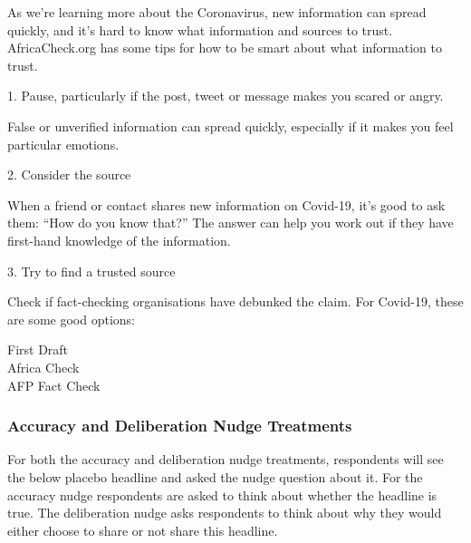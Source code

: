 \documentclass[letterpaper, 12pt, parskip=full,]{scrartcl}
\begin{document}
As we're learning more about the Coronavirus, new information can spread quickly, and it's hard to know what information and sources to trust. AfricaCheck.org has some tips for how to be smart about what information to trust. 

1. Pause, particularly if the post, tweet or message makes you scared or angry. 

False or unverified information can spread quickly, especially if it makes you feel particular emotions.

2. Consider the source

When a friend or contact shares new information on Covid-19, it’s good to ask them: “How do you know that?” The answer can help you work out if they have first-hand knowledge of the information.

3. Try to find a trusted source

Check if fact-checking organisations have debunked the claim. For Covid-19, these are some good options:

First Draft\\
Africa Check\\
AFP Fact Check

\subsubsection{Accuracy and Deliberation Nudge Treatments}\label{sec:nudge}

For both the accuracy and deliberation nudge treatments, respondents will see the below placebo headline and asked the nudge question about it. For the accuracy nudge respondents are asked to think about whether the headline is true. The deliberation nudge asks respondents to think about why they would either choose to share or not share this headline.
\end{document}
